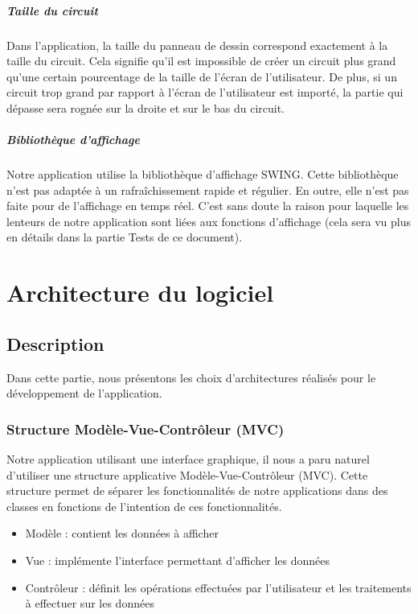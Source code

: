 \documentclass{report}
\begin{document}
\paragraph{Taille du circuit}

Dans l’application, la taille du panneau de dessin correspond exactement à la taille du circuit. Cela signifie qu’il est impossible de créer un circuit plus grand qu’une certain pourcentage de la taille de l’écran de l’utilisateur.
De plus, si un circuit trop grand par rapport à l’écran de l’utilisateur est importé, la partie qui dépasse sera rognée sur la droite et sur le bas du circuit.

\paragraph{Bibliothèque d'affichage}

Notre application utilise la bibliothèque d’affichage SWING. Cette bibliothèque n’est pas adaptée à un rafraîchissement rapide et régulier. En outre, elle n’est pas faite pour de l’affichage en temps réel. C’est sans doute la raison pour laquelle les lenteurs de notre application sont liées aux fonctions d’affichage (cela sera vu plus en détails dans la partie Tests de ce document).

\chapter{Architecture du logiciel}

\section{Description}

Dans cette partie, nous présentons les choix d'architectures réalisés pour le développement de l'application.

\subsection{Structure Modèle-Vue-Contrôleur (MVC)}

Notre application utilisant une interface graphique, il nous a paru naturel d'utiliser une structure applicative Modèle-Vue-Contrôleur (MVC). Cette structure permet de séparer les fonctionnalités de notre applications dans des classes en fonctions de l'intention de ces fonctionnalités. 
\begin{itemize}
\item Modèle : contient les données à afficher
\item Vue : implémente l'interface permettant d'afficher les données
\item Contrôleur : définit les opérations effectuées par l'utilisateur et les traitements à effectuer sur les données
\end{itemize}
\end{document}
